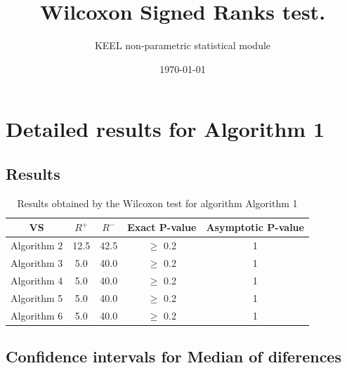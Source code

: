\documentclass[a4paper,10pt]{article}
\title{Wilcoxon Signed Ranks test.}
\date{\today}
\author{KEEL non-parametric statistical module}
\begin{document}
\pagestyle{empty}
\maketitle
\thispagestyle{empty}



\section{Detailed results for Algorithm 1}


\subsection{Results}

\begin{table}[!htp]
\centering\small
\begin{tabular}{
|c|c|c|c|c|}
\hline
 VS & $R^{+}$ & $R^{-}$ & Exact P-value & Asymptotic P-value \\ \hline 
Algorithm 2 & 12.5 & 42.5 & $\geq$ 0.2 & 1\\ \hline 
Algorithm 3 & 5.0 & 40.0 & $\geq$ 0.2 & 1\\ \hline 
Algorithm 4 & 5.0 & 40.0 & $\geq$ 0.2 & 1\\ \hline 
Algorithm 5 & 5.0 & 40.0 & $\geq$ 0.2 & 1\\ \hline 
Algorithm 6 & 5.0 & 40.0 & $\geq$ 0.2 & 1\\ \hline 

\end{tabular}
\caption{Results obtained by the Wilcoxon test for algorithm Algorithm 1}
\end{table}

\subsection{Confidence intervals for Median of diferences}
\end{document}
